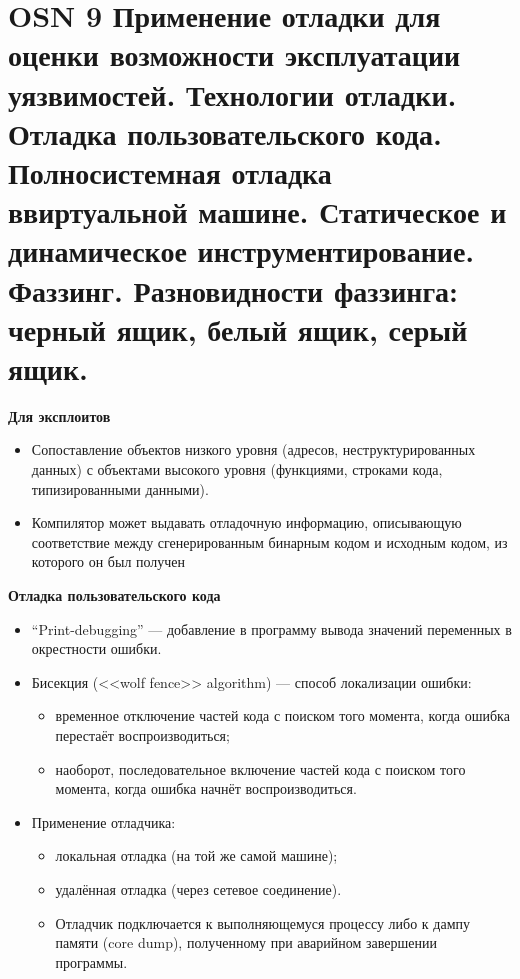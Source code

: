 \section*{OSN 9 Применение отладки для оценки возможности эксплуатации уязвимостей. Технологии отладки. Отладка пользовательского кода. Полносистемная отладка ввиртуальной машине. Статическое и динамическое инструментирование. Фаззинг. Разновидности фаззинга: черный ящик, белый ящик, серый ящик.}

\textbf{Для эксплоитов}
\begin{itemize}
  \item Сопоставление объектов низкого уровня (адресов, неструктурированных данных) с объектами высокого уровня (функциями, строками кода, типизированными данными).
  \item Компилятор может выдавать отладочную информацию, описывающую соответствие между сгенерированным бинарным кодом и исходным кодом, из которого он был получен
\end{itemize}

\textbf{Отладка пользовательского кода}
\begin{itemize}
    \item “Print-debugging” — добавление в программу вывода значений переменных в окрестности ошибки.
    \item Бисекция (<<wolf fence>> algorithm) — способ локализации ошибки:
    \begin{itemize}
        \item временное отключение частей кода с поиском того момента, когда ошибка перестаёт воспроизводиться;
        \item наоборот, последовательное включение частей кода с поиском того момента, когда ошибка начнёт воспроизводиться.
    \end{itemize}
    \item  Применение отладчика:
    \begin{itemize}
        \item локальная отладка (на той же самой машине);
        \item удалённая отладка (через сетевое соединение).
        \item Отладчик подключается к выполняющемуся процессу либо к дампу памяти (core dump), полученному при аварийном завершении программы.
    \end{itemize}
\end{itemize}



